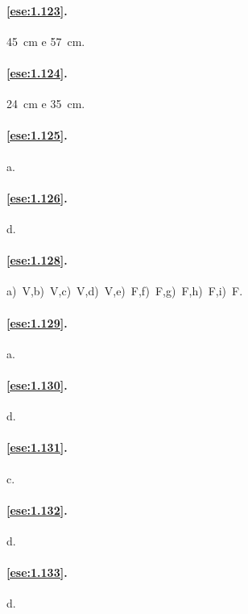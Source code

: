 \paragraph{\ref{ese:1.123}.}
45~cm e 57~cm.

\paragraph{\ref{ese:1.124}.}
24~cm e 35~cm.

\paragraph{\ref{ese:1.125}.}
a.

\paragraph{\ref{ese:1.126}.}
d.

\paragraph{\ref{ese:1.128}.}
a)~V,\quad b)~V,\quad c)~V,\quad d)~V,\quad e)~F,\quad f)~F,\quad g)~F,\quad h)~F,\quad i)~F.

\paragraph{\ref{ese:1.129}.}
a.

\paragraph{\ref{ese:1.130}.}
d.

\paragraph{\ref{ese:1.131}.}
c.

\paragraph{\ref{ese:1.132}.}
d.

\paragraph{\ref{ese:1.133}.}
d.

\endgroup
